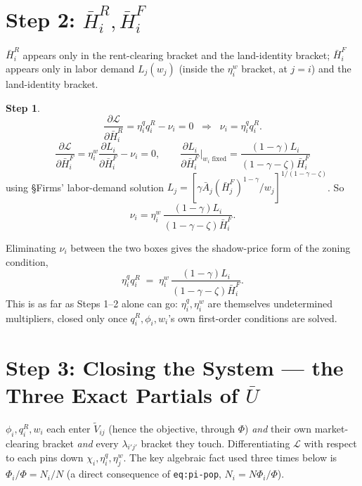 \documentclass[12pt, a4paper]{article}
\theoremstyle{definition}
\newtheorem{step}{Step}
\begin{document}
\section*{Step 2: $\bar H_i^R,\bar H_i^F$}

$\bar H_i^R$ appears only in the rent-clearing bracket and the land-identity bracket; $\bar H_i^F$ appears only in labor demand $L_j(w_j)$ (inside the $\eta_i^w$ bracket, at $j=i$) and the land-identity bracket.
\begin{step}
\[
\frac{\partial \mathcal L}{\partial \bar H_i^R} = \eta_i^q q_i^R - \nu_i = 0 \;\;\Longrightarrow\;\; \nu_i = \eta_i^q q_i^R.
\]
\[
\frac{\partial \mathcal L}{\partial \bar H_i^F} = \eta_i^w\frac{\partial L_i}{\partial \bar H_i^F} - \nu_i = 0, \qquad \frac{\partial L_i}{\partial \bar H_i^F}\bigg|_{w_i\text{ fixed}} = \frac{(1-\gamma)L_i}{(1-\gamma-\zeta)\bar H_i^F}
\]
using \S Firms' labor-demand solution $L_j=[\gamma\bar A_j(\bar H_j^F)^{1-\gamma}/w_j]^{1/(1-\gamma-\zeta)}$. So
\[
\nu_i = \eta_i^w\,\frac{(1-\gamma)L_i}{(1-\gamma-\zeta)\bar H_i^F}.
\]
\end{step}
Eliminating $\nu_i$ between the two boxes gives the shadow-price form of the zoning condition,
\begin{equation}
\eta_i^q q_i^R \;=\; \eta_i^w\,\frac{(1-\gamma)L_i}{(1-\gamma-\zeta)\bar H_i^F}. \label{eq:shadow-price-form}
\end{equation}
This is as far as Steps 1--2 alone can go: $\eta_i^q,\eta_i^w$ are themselves undetermined multipliers, closed only once $q_i^R,\phi_i,w_i$'s own first-order conditions are solved.

\section*{Step 3: Closing the System — the Three Exact Partials of $\bar U$}

$\phi_i,q_i^R,w_i$ each enter $\tilde V_{ij}$ (hence the objective, through $\Phi$) \emph{and} their own market-clearing bracket \emph{and} every $\lambda_{i'j'}$ bracket they touch. Differentiating $\mathcal L$ with respect to each pins down $\chi_i,\eta_i^q,\eta_j^w$. The key algebraic fact used three times below is $\Phi_i/\Phi=N_i/N$ (a direct consequence of \texttt{eq:pi-pop}, $N_i=N\Phi_i/\Phi$).
\end{document}
